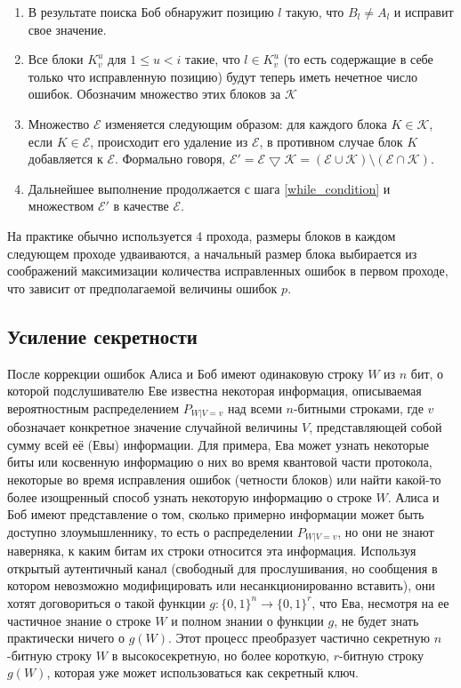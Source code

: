 \begin{enumerate}
  \item В результате поиска Боб обнаружит позицию $l$ такую, что $B_l \neq A_l$ и исправит свое значение. 
  
  \item Все блоки $K^u_v$ для $1 \leq u < i$ такие, что $l \in K^u_v$ (то есть содержащие в себе только что исправленную позицию) будут теперь иметь нечетное число ошибок. Обозначим множество этих блоков за $\mathcal{K}$
  
  \item Множество $\mathcal{E}$ изменяется следующим образом: для каждого блока $K \in \mathcal{K}$, если $K \in \mathcal{E}$, происходит его удаление из $\mathcal{E}$, в противном случае блок $K$ добавляется к $\mathcal{E}$. Формально говоря, $\mathcal{E}' = \mathcal{E} \bigtriangledown \mathcal{K} = (\mathcal{E} \cup \mathcal{K}) \setminus (\mathcal{E} \cap \mathcal{K})$.
  
  \item Дальнейшее выполнение продолжается с шага \ref{while_condition} и множеством $\mathcal{E}'$ в качестве $\mathcal{E}$.

\end{enumerate}
На практике обычно используется 4 прохода, размеры блоков в каждом следующем проходе удваиваются, а начальный размер блока выбирается из соображений максимизации количества исправленных ошибок в первом проходе, что зависит от предполагаемой величины ошибок $p$.

\subsection{Усиление секретности}
После коррекции ошибок Алиса и Боб имеют одинаковую строку $W$ из $n$ бит, о которой подслушивателю Еве известна некоторая информация, описываемая вероятностным распределением $P_{W|V=v}$ над всеми $n$-битными строками, где $v$ обозначает конкретное значение случайной величины $V$, представляющей собой сумму всей её (Евы) информации. Для примера, Ева может узнать некоторые биты или косвенную информацию о них во время квантовой части протокола, некоторые во время исправления ошибок (четности блоков) или найти какой-то более изощренный способ узнать некоторую информацию о строке $W$. Алиса и Боб имеют представление о том, сколько примерно информации может быть доступно злоумышленнику, то есть о распределении $P_{W|V=v}$, но они не знают наверняка, к каким битам их строки относится эта информация. Используя открытый аутентичный канал (свободный для прослушивания, но сообщения в котором невозможно модифицировать или несанкционированно вставить), они хотят договориться о такой функции $g: \{0, 1\}^n \rightarrow \{
0,1\}^r$, что Ева, несмотря на ее частичное знание о строке $W$ и полном знании о функции $g$, не будет знать практически ничего о $g(W)$. Этот процесс преобразует частично секретную $n$-битную строку $W$ в высокосекретную, но более короткую, $r$-битную строку $g(W)$, которая уже может использоваться как секретный ключ.

